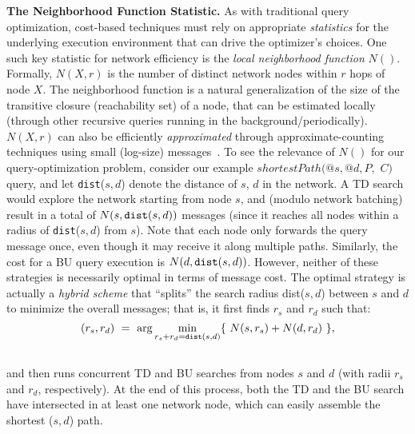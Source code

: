 \vspace*{.3em}\noindent
{\bf The Neighborhood Function Statistic.\/}
As with traditional query optimization, cost-based techniques must
rely on appropriate {\em statistics\/} for the underlying execution
environment that can drive the optimizer's choices.
One such key statistic for network efficiency is the
{\em local neighborhood function\/} $N()$.
Formally, $N(X,r)$ is the number of distinct network nodes within
$r$ hops of node $X$.
The neighborhood function is a natural generalization of the size of the 
transitive closure (\ie reachability set) of a node, 
that can be estimated locally (\eg through other recursive queries running in the background/periodically).
$N(X,r)$  can also be efficiently {\em approximated\/} through 
approximate-counting techniques using small (log-size) 
messages~\cite{anf}.
To see the relevance of $N()$ for our query-optimization problem, consider 
our example $shortestPath(@s,@d,P,$ $C)$ query,  and
let {\tt dist}($s,d$)  denote the distance of $s$, $d$ in the network.
A TD search would explore the network starting from node $s$, and 
(modulo network batching) result in a total of
$N(s, {\tt dist}(s,d))$ messages  
(since it reaches all nodes within a radius of {\tt dist}($s,d$) from $s$). 
Note that each node only forwards the query message once, even though it may 
receive it along multiple paths.
Similarly, the cost for a BU query execution is $N(d, {\tt dist}(s,d))$.
However, neither of these strategies is necessarily
optimal in terms of message cost.
The optimal strategy is actually a {\em hybrid scheme\/} that ``splits'' the search 
radius dist($s,d$)
between $s$ and $d$ to minimize the overall messages; that is,
it first finds $r_s$ and $r_d$ such that:
\vspace*{-6pt}\noindent
\[
(r_s, r_d)\ =\ \arg\min_{r_s+r_d = {\scriptsize\tt dist}(s,d)}\{\ N(s, r_s) + N(d, r_d)\ \},
\]
\vspace*{-10pt}\noindent
\noindent\\
and then runs concurrent TD and BU searches from nodes $s$ and $d$ (with radii $r_s$ and $r_d$,
respectively).
At the end of this process, both the TD and the BU search have intersected in 
at least one network node, which can easily assemble the shortest ($s,d$) path.
